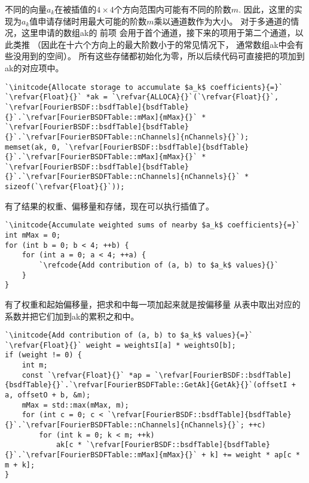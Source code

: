 不同的向量$a_k$在被插值的$4\times4$个方向范围内可能有不同的阶数$m$.
因此，这里的实现为$a_k$值申请存储时用最大可能的阶数$m$乘以通道数作为大小。
对于多通道的情况，这里申请的数组{\ttfamily ak}的
前项
会用于首个通道，接下来的项用于第二个通道，以此类推
（因此在十六个方向上的最大阶数小于的常见情况下，
通常数组{\ttfamily ak}中会有些没用到的空间）。
所有这些存储都初始化为零，所以后续代码可直接把的项加到{\ttfamily ak}的对应项中。
\begin{lstlisting}
`\initcode{Allocate storage to accumulate $a_k$ coefficients}{=}`
`\refvar{Float}{}` *ak = `\refvar{ALLOCA}{}`(`\refvar{Float}{}`, `\refvar[FourierBSDF::bsdfTable]{bsdfTable}{}`.`\refvar[FourierBSDFTable::mMax]{mMax}{}` * `\refvar[FourierBSDF::bsdfTable]{bsdfTable}{}`.`\refvar[FourierBSDFTable::nChannels]{nChannels}{}`);
memset(ak, 0, `\refvar[FourierBSDF::bsdfTable]{bsdfTable}{}`.`\refvar[FourierBSDFTable::mMax]{mMax}{}` * `\refvar[FourierBSDF::bsdfTable]{bsdfTable}{}`.`\refvar[FourierBSDFTable::nChannels]{nChannels}{}` * sizeof(`\refvar{Float}{}`));
\end{lstlisting}

有了结果的权重、偏移量和存储，现在可以执行插值了。
\begin{lstlisting}
`\initcode{Accumulate weighted sums of nearby $a_k$ coefficients}{=}`
int mMax = 0;
for (int b = 0; b < 4; ++b) {
    for (int a = 0; a < 4; ++a) {
        `\refcode{Add contribution of (a, b) to $a_k$ values}{}`
    }
}
\end{lstlisting}

有了权重和起始偏移量，把求和中每一项加起来就是按偏移量
从表中取出对应的系数并把它们加到{\ttfamily ak}的累积之和中。
\begin{lstlisting}
`\initcode{Add contribution of (a, b) to $a_k$ values}{=}`
`\refvar{Float}{}` weight = weightsI[a] * weightsO[b];
if (weight != 0) {
    int m;
    const `\refvar{Float}{}` *ap = `\refvar[FourierBSDF::bsdfTable]{bsdfTable}{}`.`\refvar[FourierBSDFTable::GetAk]{GetAk}{}`(offsetI + a, offsetO + b, &m);
    mMax = std::max(mMax, m);
    for (int c = 0; c < `\refvar[FourierBSDF::bsdfTable]{bsdfTable}{}`.`\refvar[FourierBSDFTable::nChannels]{nChannels}{}`; ++c)
        for (int k = 0; k < m; ++k)
            ak[c * `\refvar[FourierBSDF::bsdfTable]{bsdfTable}{}`.`\refvar[FourierBSDFTable::mMax]{mMax}{}` + k] += weight * ap[c * m + k];
}
\end{lstlisting}

